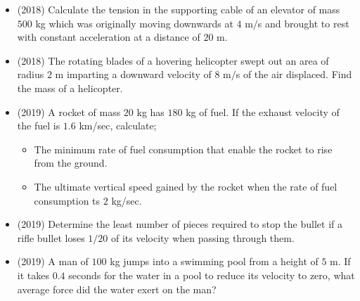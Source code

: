 \documentclass{article}
\begin{document}
\begin{itemize}
\item (2018)  Calculate the tension in the supporting cable of an elevator of mass $ 500$ kg which was originally moving downwards at $ 4$ m$/$s and brought to rest with constant acceleration at a distance of $ 20$ m. 
\item (2018)  The rotating blades of a hovering helicopter swept out an area of radius $ 2$ m imparting a downward velocity of $ 8$ m$/$s of the air displaced. Find the mass of a helicopter. 
\item (2019)  A rocket of mass $ 20$ kg has $ 180$ kg of fuel. If the exhaust velocity of the fuel is $ 1.6$ km/sec, calculate;
 \begin{itemize}
\item The minimum rate of fuel consumption that enable the rocket to rise from the ground. 
\item The ultimate vertical speed gained by the rocket when the rate of fuel consumption ts $ 2$ kg/sec. 
\end{itemize}
\item (2019)  Determine the least number of pieces required to stop the bullet if a rifle bullet loses $ 1/20$ of its velocity when passing through them.
\item (2019)  A man of $ 100$ kg jumps into a swimming pool from a height of $ 5$ m. If it takes $ 0.4$ seconds for the water in a pool to reduce its velocity to zero, what average force did  the water exert on the man? 
\end{itemize}
\end{document}
